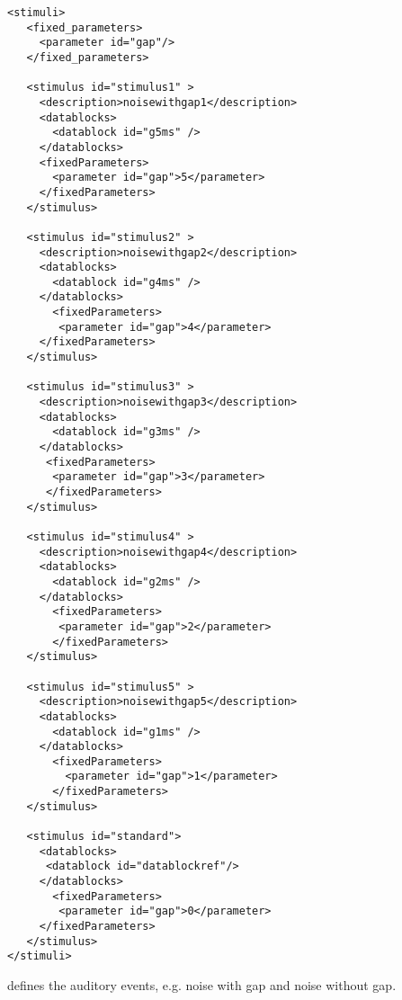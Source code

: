 \begin{lstlisting}
<stimuli>
   <fixed_parameters>
     <parameter id="gap"/>
   </fixed_parameters>

   <stimulus id="stimulus1" >
     <description>noisewithgap1</description>
     <datablocks>
       <datablock id="g5ms" />
     </datablocks>
     <fixedParameters>
       <parameter id="gap">5</parameter>
     </fixedParameters>
   </stimulus>

   <stimulus id="stimulus2" >
     <description>noisewithgap2</description>
     <datablocks>
       <datablock id="g4ms" />
     </datablocks>
       <fixedParameters>
        <parameter id="gap">4</parameter>
     </fixedParameters>
   </stimulus>

   <stimulus id="stimulus3" >
     <description>noisewithgap3</description>
     <datablocks>
       <datablock id="g3ms" />
     </datablocks>
      <fixedParameters>
       <parameter id="gap">3</parameter>
      </fixedParameters>
   </stimulus>

   <stimulus id="stimulus4" >
     <description>noisewithgap4</description>
     <datablocks>
       <datablock id="g2ms" />
     </datablocks>
       <fixedParameters>
        <parameter id="gap">2</parameter>
       </fixedParameters>
   </stimulus>

   <stimulus id="stimulus5" >
     <description>noisewithgap5</description>
     <datablocks>
       <datablock id="g1ms" />
     </datablocks>
       <fixedParameters>
         <parameter id="gap">1</parameter>
       </fixedParameters>
   </stimulus>

   <stimulus id="standard">
     <datablocks>
      <datablock id="datablockref"/>
     </datablocks>
       <fixedParameters>
        <parameter id="gap">0</parameter>
     </fixedParameters>
   </stimulus>
</stimuli>
\end{lstlisting}


 defines the auditory events, e.g. noise with gap
and noise without gap.


